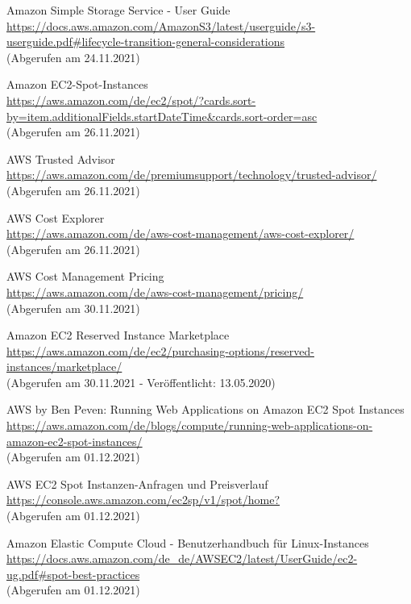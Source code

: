 \begin{thebibliography}{HR08}
 Amazon Simple Storage Service - User Guide\\
  \url{https://docs.aws.amazon.com/AmazonS3/latest/userguide/s3-userguide.pdf#lifecycle-transition-general-considerations}\\
  (Abgerufen am 24.11.2021)

 Amazon EC2-Spot-Instances\\
  \url{https://aws.amazon.com/de/ec2/spot/?cards.sort-by=item.additionalFields.startDateTime&cards.sort-order=asc}\\
  (Abgerufen am 26.11.2021)
  
    AWS Trusted Advisor\\
  \url{https://aws.amazon.com/de/premiumsupport/technology/trusted-advisor/}\\
  (Abgerufen am 26.11.2021)

   AWS Cost Explorer\\
  \url{https://aws.amazon.com/de/aws-cost-management/aws-cost-explorer/}\\
  (Abgerufen am 26.11.2021)

   AWS Cost Management Pricing\\
  \url{https://aws.amazon.com/de/aws-cost-management/pricing/}\\
  (Abgerufen am 30.11.2021)

 Amazon EC2 Reserved Instance Marketplace\\
  \url{https://aws.amazon.com/de/ec2/purchasing-options/reserved-instances/marketplace/}\\
  (Abgerufen am 30.11.2021 - Veröffentlicht: 13.05.2020)

 AWS by Ben Peven: Running Web Applications on Amazon EC2 Spot Instances\\
  \url{https://aws.amazon.com/de/blogs/compute/running-web-applications-on-amazon-ec2-spot-instances/}\\
  (Abgerufen am 01.12.2021)

 AWS EC2 Spot Instanzen-Anfragen und Preisverlauf\\
  \url{https://console.aws.amazon.com/ec2sp/v1/spot/home?}\\
  (Abgerufen am 01.12.2021)

 Amazon Elastic Compute Cloud - Benutzerhandbuch für Linux-Instances\\
  \url{https://docs.aws.amazon.com/de_de/AWSEC2/latest/UserGuide/ec2-ug.pdf#spot-best-practices}\\
  (Abgerufen am 01.12.2021)
  

\end{thebibliography}
